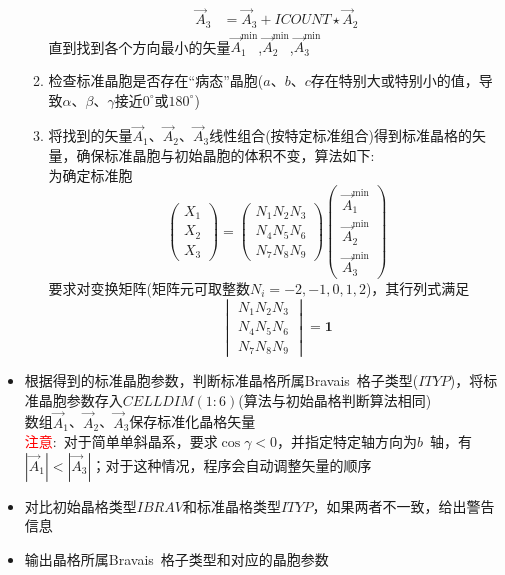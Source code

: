 \begin{itemize}
\begin{enumerate}
\begin{displaymath}
\begin{aligned}
						\vec A_3&=\vec A_3+\mathit{ICOUNT}\star\vec A_2
					\end{aligned}
				\end{displaymath}
				直到找到各个方向最小的矢量$\vec A_1^{\mathrm{min}}$,$\vec A_2^{\mathrm{min}}$,$\vec A_3^{\mathrm{min}}$
			\item 检查标准晶胞是否存在“病态”晶胞($a$、$b$、$c$存在特别大或特别小的值，导致$\alpha$、$\beta$、$\gamma$接近$0^{\circ}$或$180^{\circ}$)
			\item 将找到的矢量$\vec A_1$、$\vec A_2$、$\vec A_3$线性组合(按特定标准组合)得到标准晶格的矢量，确保标准晶胞与初始晶胞的体积不变，算法如下:\\
				为确定标准胞
				\begin{displaymath}
					\begin{pmatrix}
						X_1\\
						X_2\\
						X_3
					\end{pmatrix}=
\begin{pmatrix}
						N_1 N_2 N_3\\
						N_4 N_5 N_6\\
						N_7 N_8 N_9
\end{pmatrix}
\begin{pmatrix}
	\vec A_1^{\mathrm{min}} \\
	\vec A_2^{\mathrm{min}} \\
	\vec A_3^{\mathrm{min}}
\end{pmatrix}
				\end{displaymath}
				要求对变换矩阵(矩阵元可取整数$N_i=-2,-1,0,1,2$)，其行列式满足
				\begin{displaymath}
					\begin{vmatrix}
						N_1 N_2 N_3\\
						N_4 N_5 N_6\\
						N_7 N_8 N_9
					\end{vmatrix}=\mathbf{1}
				\end{displaymath}
		\end{enumerate}
			\item 根据得到的标准晶胞参数，判断标准晶格所属\textrm{Bravais~}格子类型($\mathit{ITYP}$)，将标准晶胞参数存入$\mathit{CELLDIM}(1:6)$(算法与初始晶格判断算法相同)\\
				数组$\vec A_1$、$\vec A_2$、$\vec A_3$保存标准化晶格矢量\\
				\textcolor{red}{注意}:~对于简单单斜晶系，要求$\cos\gamma<0$，并指定特定轴方向为$b$~轴，有$|\vec A_1|<|\vec A_3|$；对于这种情况，程序会自动调整矢量的顺序
			\item 对比初始晶格类型$\mathit{IBRAV}$和标准晶格类型$\mathit{ITYP}$，如果两者不一致，给出警告信息
			\item 输出晶格所属\textrm{Bravais~}格子类型和对应的晶胞参数
\end{itemize}

